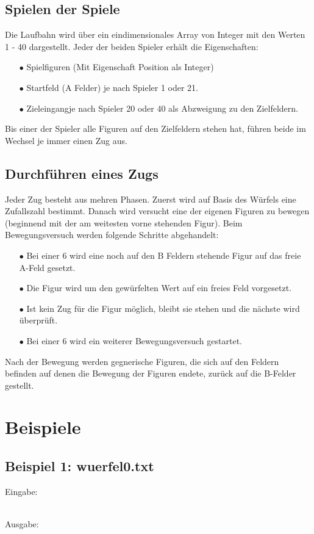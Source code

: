 \documentclass[a4paper,11pt,ngerman]{scrartcl}
\begin{document}
\subsection{Spielen der \glqq Spiele\grqq}
Die Laufbahn wird über ein eindimensionales Array von Integer mit den Werten 1 - 40 dargestellt. Jeder der beiden Spieler erhält die Eigenschaften:
\begin{enumerate}
	\item[$\bullet$] Spielfiguren (Mit Eigenschaft Position als Integer)
	\item[$\bullet$] Startfeld (\glqq A Felder\grqq) je nach Spieler 1 oder 21.
	\item[$\bullet$] \glqq Zieleingang\grqq \space je nach Spieler 20 oder 40 als Abzweigung zu den Zielfeldern.	
\end{enumerate} 
Bis einer der Spieler alle Figuren auf den Zielfeldern stehen hat, führen beide im Wechsel je immer einen Zug aus.
\subsection{Durchführen eines Zugs}
Jeder Zug besteht aus mehren Phasen. Zuerst wird auf Basis des Würfels eine Zufallszahl bestimmt. Danach wird versucht eine der eigenen Figuren zu bewegen (beginnend mit der am weitesten vorne stehenden Figur). Beim Bewegungsversuch werden folgende Schritte abgehandelt:
\begin{enumerate}
	\item[$\bullet$] Bei einer 6 wird eine noch auf den B Feldern stehende Figur auf das freie A-Feld gesetzt.
	\item[$\bullet$] Die Figur wird um den gewürfelten Wert auf ein freies Feld vorgesetzt.
	\item[$\bullet$] Ist kein Zug für die Figur möglich, bleibt sie stehen und die nächste wird überprüft.
	\item[$\bullet$] Bei einer 6 wird ein weiterer Bewegungsversuch gestartet.	
\end{enumerate}
Nach der Bewegung werden gegnerische Figuren, die sich auf den Feldern befinden auf denen die Bewegung der Figuren endete, zurück auf die B-Felder gestellt.

 

\section{Beispiele}
\subsection{Beispiel 1: wuerfel0.txt}
Eingabe:
\begin{tcolorbox}[center,width=12cm,title=Textfiles/wuerfel0.txt]
	\centering
	
\end{tcolorbox}
\\ Ausgabe:
\centering
\begin{tcolorbox}[center,width=16cm,title=Textfiles/wuerfel0\_result.txt]
	
	
\end{tcolorbox}
\end{document}
